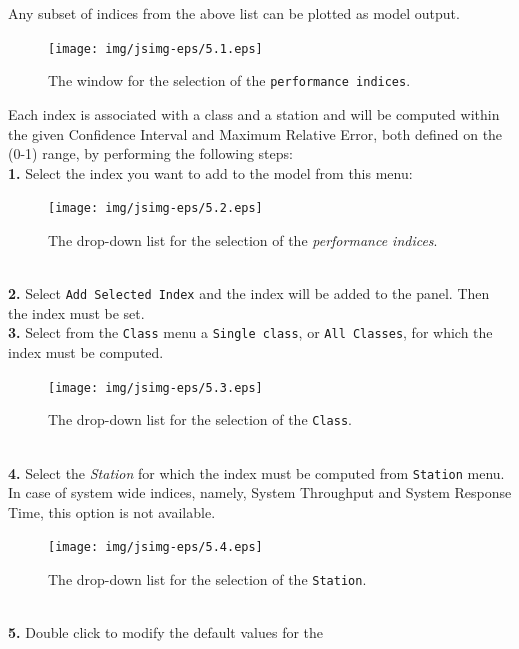 Any subset of indices from the above list can be plotted as
model output.
\begin{figure}[htb]
    \begin{center}
        \texttt{[image: img/jsimg-eps/5.1.eps]}
    \end{center}
    \caption{The window for the selection of the \texttt{performance indices}.}
    \label{fig:selperfind}
\end{figure}
Each index is associated with a class and a station and will be
computed within the given Confidence Interval and Maximum Relative
Error, both defined on the (0-1) range, by performing the
following steps:\\
\textbf{1.} Select the index you want to add to the model from
this menu:
\begin{figure}[htb]
    \begin{center}
        \texttt{[image: img/jsimg-eps/5.2.eps]}
    \end{center}
    \caption{The drop-down list for the selection of the \emph{performance indices}.}
    \label{fig:dropdownlistperfind}
\end{figure}\\
\textbf{2.} Select \texttt{Add Selected Index} and the index will
be added to the
panel. Then the index must be set.\\
\textbf{3.} Select from the \texttt{Class} menu a \texttt{Single
class}, or \texttt{All Classes}, for which the index must be
computed.
\begin{figure}[h!]
    \begin{center}
        \texttt{[image: img/jsimg-eps/5.3.eps]}
    \end{center}
    \caption{The drop-down list for the selection of the \texttt{Class}.}
    \label{fig:dropdownlistclass}
\end{figure}\\
\textbf{4.} Select the \emph{Station} for which the index must be
computed from \texttt{Station} menu. In case of system wide
indices, namely, System Throughput and System Response Time, this
option is not available.
\begin{figure}[h!]
    \begin{center}
        \texttt{[image: img/jsimg-eps/5.4.eps]}
    \end{center}
    \caption{The drop-down list for the selection of the \texttt{Station}.}
    \label{fig:dropdownliststat}
\end{figure}\\
\textbf{5.} Double click to modify the default values for the
